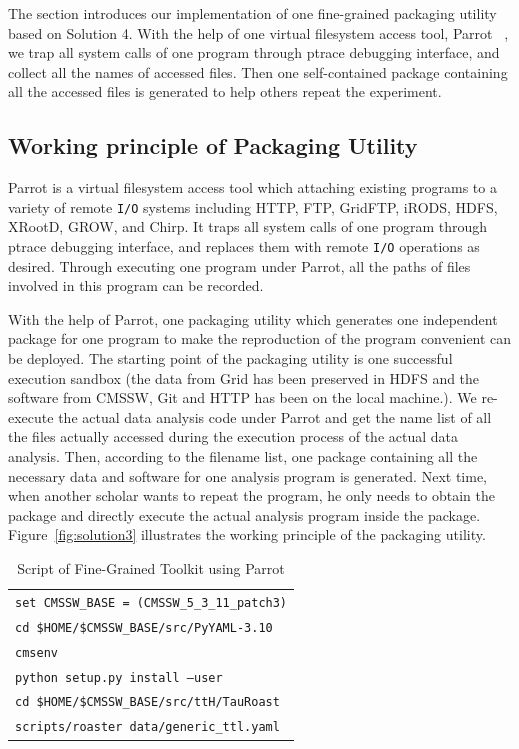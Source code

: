 \documentclass{acm_proc_article-sp}
\begin{document}
The section introduces our implementation of one fine-grained packaging utility based on Solution 4. With the help of one
virtual filesystem access tool, Parrot ~\cite{thain2005parrot}, we trap all system calls of one
program through ptrace debugging interface, and collect all the names of accessed files. 
Then one self-contained package containing all the accessed files is generated to help others repeat the experiment.

\subsection{Working principle of Packaging Utility} 

Parrot is a virtual filesystem access tool which attaching existing programs to
a variety of remote {\tt I/O} systems including 
HTTP, FTP, GridFTP, iRODS, HDFS, XRootD, GROW, and Chirp. It traps all system calls of one program through ptrace
debugging interface, and replaces them with remote {\tt I/O} operations as desired.
Through executing one program under Parrot, all the paths of files involved in
this program can be recorded.  

With the help of Parrot, one packaging utility which generates one independent
package for one program to make the reproduction of the program convenient can
be deployed. The starting point of the packaging utility is one successful execution
sandbox (the data from Grid has been preserved in HDFS and the software from
CMSSW, Git and HTTP has been on the local machine.). We re-execute the actual
data analysis code under Parrot and get the name list of all the files actually
accessed during the execution process of the actual data analysis. Then,
according to the filename list, one package containing all the necessary data
and software for one analysis program is generated. Next time, when another
scholar wants to repeat the program, he only needs to obtain the package and
directly execute the actual analysis program inside the package. 
Figure~\ref{fig:solution3} illustrates the working principle of the packaging utility.

\begin{table}
    \centering
    \begin{tabular}{|l|}
        \hline
        {\tt set CMSSW\_BASE = (CMSSW\_5\_3\_11\_patch3)} \\
        {\tt cd \$HOME/\$CMSSW\_BASE/src/PyYAML-3.10}\\
        {\tt cmsenv} \\
        {\tt python setup.py install --user} \\
        {\tt cd \$HOME/\$CMSSW\_BASE/src/ttH/TauRoast}\\
        {\tt scripts/roaster data/generic\_ttl.yaml} \\
        \hline
    \end{tabular}
    \caption{Script of Fine-Grained Toolkit using Parrot}
    \label{table:parrot-script}
\end{table}
\end{document}
